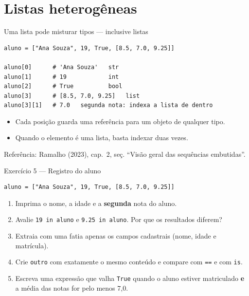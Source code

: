 \documentclass[aspectratio=169]{beamer}
\newcommand{\fonte}[1]{\vfill{\scriptsize\color{UFSGray}Refer\^encia: #1}}
\begin{document}
\section{Listas heterogêneas}

\begin{frame}[fragile]{Uma lista pode misturar tipos --- inclusive listas}
\begin{lstlisting}
aluno = ["Ana Souza", 19, True, [8.5, 7.0, 9.25]]

aluno[0]      # 'Ana Souza'   str
aluno[1]      # 19            int
aluno[2]      # True          bool
aluno[3]      # [8.5, 7.0, 9.25]   list
aluno[3][1]   # 7.0   segunda nota: indexa a lista de dentro
\end{lstlisting}

\begin{itemize}
  \item Cada posição guarda uma referência para um objeto de qualquer tipo.
  \item Quando o elemento é uma lista, basta indexar duas vezes.
\end{itemize}

\fonte{Ramalho (2023), cap.\ 2, se\c{c}. ``Vis\~ao geral das sequ\^encias embutidas''.}
\end{frame}

\begin{frame}[fragile]{Exercício 5 --- Registro do aluno}
\begin{lstlisting}
aluno = ["Ana Souza", 19, True, [8.5, 7.0, 9.25]]
\end{lstlisting}

\begin{enumerate}
  \item Imprima o nome, a idade e a \textbf{segunda} nota do aluno.
  \item Avalie \texttt{19 in aluno} e \texttt{9.25 in aluno}. Por que os resultados diferem?
  \item Extraia com uma fatia apenas os campos cadastrais (nome, idade e matrícula).
  \item Crie \texttt{outro} com exatamente o mesmo conteúdo e compare com \texttt{==} e com \texttt{is}.
  \item Escreva uma expressão que valha \texttt{True} quando o aluno estiver matriculado \textbf{e} a média das notas for pelo menos 7,0.
\end{enumerate}
\end{frame}
\end{document}

